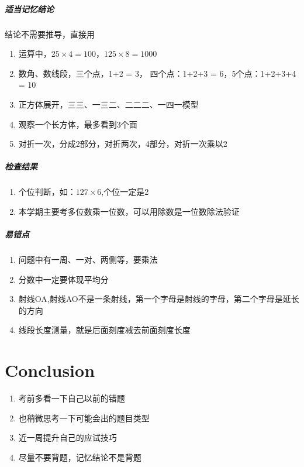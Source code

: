 \documentclass[a4paper,12pt]{article}
\begin{document}
\subsubsection{适当记忆结论}
结论不需要推导，直接用
\begin{enumerate}
        \item 运算中，$25 \times 4 = 100$，$125\times 8 = 1000$
        \item 数角、数线段，三个点，1+2 = 3， 四个点：1+2+3 = 6，5个点：1+2+3+4 = 10
        \item 正方体展开，三三、一三二、二二二、一四一模型
        \item 观察一个长方体，最多看到3个面
        \item 对折一次，分成2部分，对折两次，4部分，对折一次乘以2
\end{enumerate}

\subsubsection{检查结果}
\begin{enumerate}
        \item 个位判断，如：$127 \times 6$,个位一定是2
        \item 本学期主要考多位数乘一位数，可以用除数是一位数除法验证

\end{enumerate}
\subsubsection{易错点}
\begin{enumerate}
        \item 问题中有一周、一对、两侧等，要乘法
        \item 分数中一定要体现平均分
        \item 射线OA,射线AO不是一条射线，第一个字母是射线的字母，第二个字母是延长的方向
        \item 线段长度测量，就是后面刻度减去前面刻度长度

\end{enumerate}


\part*{Conclusion}\label{sec:name}
\begin{enumerate}
        \item 考前多看一下自己以前的错题
        \item 也稍微思考一下可能会出的题目类型
        \item 近一周提升自己的应试技巧
        \item 尽量不要背题，记忆结论不是背题

\end{enumerate}
\end{document}
